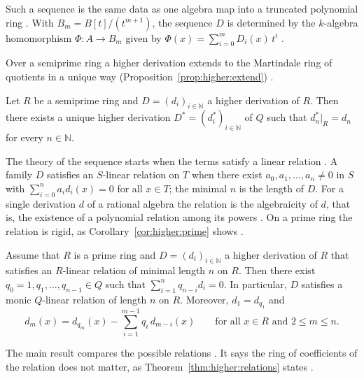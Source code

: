 Such a sequence is the same data as one algebra map into a truncated
polynomial ring \cite[p.~2984]{NarvaezMacarro2009}. With
$B_m=B[t]/(t^{m+1})$, the sequence $D$ is determined by the $k$-algebra
homomorphism $\Phi\colon A\to B_m$ given by
$\Phi(x)=\sum_{i=0}^{m} D_i(x)\,t^i$ \cite[p.~2984]{NarvaezMacarro2009}.

Over a semiprime ring a higher derivation extends to the Martindale ring of
quotients in a unique way (Proposition~\ref{prop:higher:extend}) \cite[p.~2323]{FerreroHaetinger2002}.

\begin{proposition}\label{prop:higher:extend}
Let $R$ be a semiprime ring and $D=(d_i)_{i\in\mathbb{N}}$ a higher
derivation of $R$. Then there exists a unique higher derivation
$D^{*}=(d^{*}_i)_{i\in\mathbb{N}}$ of $Q$ such that
$d^{*}_n|_R=d_n$ for every $n\in\mathbb{N}$.
\end{proposition}

The theory of the sequence starts when the terms satisfy a linear relation
\cite[p.~2323]{FerreroHaetinger2002}. A family $D$ satisfies an $S$-linear
relation on $T$ when there exist $a_0,a_1,\dots,a_n\neq 0$ in $S$ with
$\sum_{i=0}^{n} a_i d_i(x)=0$ for all $x\in T$; the minimal $n$ is the
length of $D$. For a single derivation $d$ of a rational algebra the
relation is the algebraicity of $d$, that is, the existence of a polynomial
relation among its powers \cite[p.~2322]{FerreroHaetinger2002}. On a prime
ring the relation is rigid, as Corollary~\ref{cor:higher:prime} shows
\cite[p.~2325]{FerreroHaetinger2002}.

\begin{corollary}\label{cor:higher:prime}
Assume that $R$ is a prime ring and $D=(d_i)_{i\in\mathbb{N}}$ a higher
derivation of $R$ that satisfies an $R$-linear relation of minimal length
$n$ on $R$. Then there exist $q_0=1,q_1,\dots,q_{n-1}\in Q$ such that
$\sum_{i=1}^{n} q_{n-i} d_i=0$. In particular, $D$ satisfies a monic
$Q$-linear relation of length $n$ on $R$. Moreover, $d_1=d_{q_1}$ and
\begin{equation*}
d_m(x)=d_{q_m}(x)-\sum_{i=1}^{m-1} q_i\,d_{m-i}(x)
\qquad\text{for all }x\in R\text{ and }2\leq m\leq n.
\end{equation*}
\end{corollary}

The main result compares the possible relations
\cite[pp.~2327--2328]{FerreroHaetinger2002}. It says the ring of
coefficients of the relation does not matter, as
Theorem~\ref{thm:higher:relations} states
\cite[p.~2327]{FerreroHaetinger2002}.

